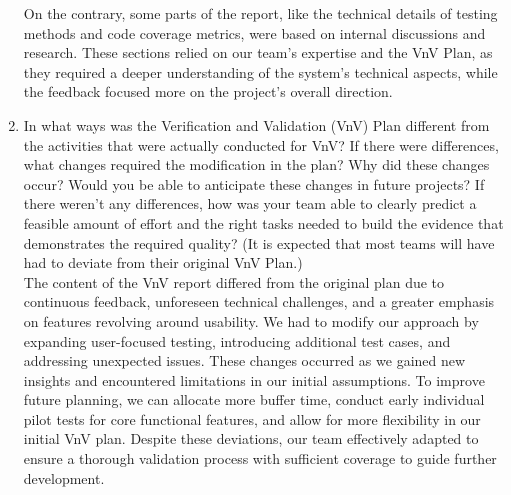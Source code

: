 \documentclass[12pt, titlepage]{article}
\begin{document}
\begin{enumerate}
  On the contrary, some parts of the report, like the technical details of testing methods 
  and code coverage metrics, were based on internal discussions and research. These sections 
  relied on our team's expertise and the VnV Plan, as they required a deeper understanding 
  of the system's technical aspects, while the feedback focused more on the project’s overall 
  direction.
  \item In what ways was the Verification and Validation (VnV) Plan different
  from the activities that were actually conducted for VnV?  If there were
  differences, what changes required the modification in the plan?  Why did
  these changes occur?  Would you be able to anticipate these changes in future
  projects?  If there weren't any differences, how was your team able to clearly
  predict a feasible amount of effort and the right tasks needed to build the
  evidence that demonstrates the required quality?  (It is expected that most
  teams will have had to deviate from their original VnV Plan.)\\
  The content of the VnV report differed from the original plan due to continuous feedback, 
  unforeseen technical challenges, and a greater emphasis on features revolving around usability. 
  We had to modify our approach by expanding user-focused testing, introducing additional test 
  cases, and addressing unexpected issues. These changes occurred as we gained new insights 
  and encountered limitations in our initial assumptions. To improve future planning, we can 
  allocate more buffer time, conduct early individual pilot tests for core functional features, and 
  allow for more flexibility in our initial VnV plan. Despite these deviations, our team 
  effectively adapted to ensure a thorough validation process with sufficient coverage to guide
  further development.
\end{enumerate}
\end{document}
